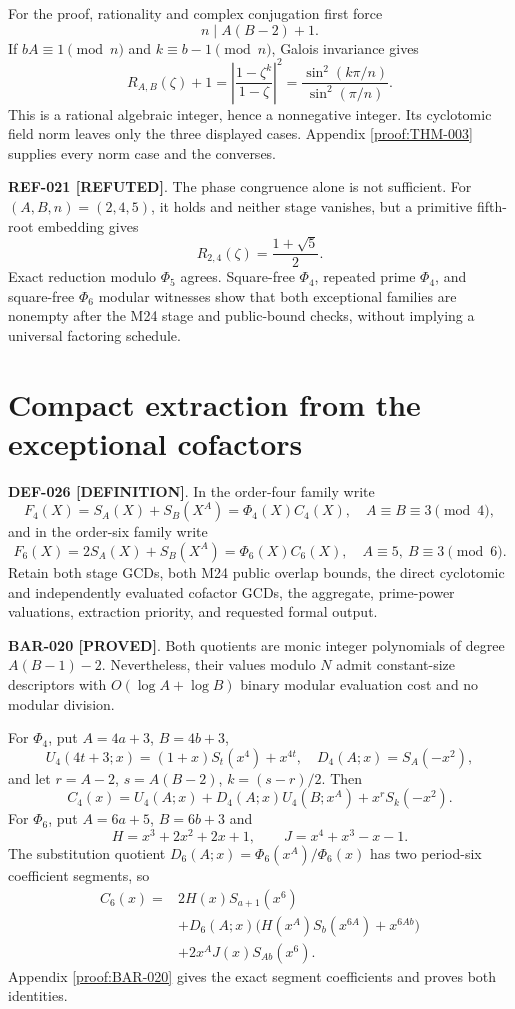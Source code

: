 \documentclass[11pt]{article}
\newcommand{\claimstatus}[2]{\textbf{#1 [#2]}}
\begin{document}
For the proof, rationality and complex conjugation first force
\[
n\mid A(B-2)+1.
\]
If \(bA\equiv1\pmod n\) and \(k\equiv b-1\pmod n\), Galois invariance gives
\[
R_{A,B}(\zeta)+1
=\left|\frac{1-\zeta^k}{1-\zeta}\right|^2
=\frac{\sin^2(k\pi/n)}{\sin^2(\pi/n)}.
\]
This is a rational algebraic integer, hence a nonnegative integer. Its
cyclotomic field norm leaves only the three displayed cases. Appendix
\ref{proof:THM-003} supplies every norm case and the converses.

\claimstatus{REF-021}{REFUTED}. The phase congruence alone is not sufficient.
For \((A,B,n)=(2,4,5)\), it holds and neither stage vanishes, but a primitive
fifth-root embedding gives
\[
R_{2,4}(\zeta)=\frac{1+\sqrt5}{2}.
\]
Exact reduction modulo \(\Phi_5\) agrees. Square-free \(\Phi_4\), repeated
prime \(\Phi_4\), and square-free \(\Phi_6\) modular witnesses show that both
exceptional families are nonempty after the M24 stage and public-bound checks,
without implying a universal factoring schedule.

\section{Compact extraction from the exceptional cofactors}

\claimstatus{DEF-026}{DEFINITION}. In the order-four family write
\[
F_4(X)=S_A(X)+S_B(X^A)=\Phi_4(X)C_4(X),
\quad A\equiv B\equiv3\pmod4,
\]
and in the order-six family write
\[
F_6(X)=2S_A(X)+S_B(X^A)=\Phi_6(X)C_6(X),
\quad A\equiv5,\ B\equiv3\pmod6.
\]
Retain both stage GCDs, both M24 public overlap bounds, the direct
cyclotomic and independently evaluated cofactor GCDs, the aggregate,
prime-power valuations, extraction priority, and requested formal output.

\claimstatus{BAR-020}{PROVED}. Both quotients are monic integer polynomials
of degree \(A(B-1)-2\). Nevertheless, their values modulo \(N\) admit
constant-size descriptors with \(O(\log A+\log B)\) binary modular
evaluation cost and no modular division.

For \(\Phi_4\), put \(A=4a+3\), \(B=4b+3\),
\[
U_4(4t+3;x)=(1+x)S_t(x^4)+x^{4t},
\quad D_4(A;x)=S_A(-x^2),
\]
and let \(r=A-2\), \(s=A(B-2)\), \(k=(s-r)/2\). Then
\[
C_4(x)=U_4(A;x)+D_4(A;x)U_4(B;x^A)+x^rS_k(-x^2).
\]
For \(\Phi_6\), put \(A=6a+5\), \(B=6b+3\) and
\[
H=x^3+2x^2+2x+1,\qquad J=x^4+x^3-x-1.
\]
The substitution quotient
\(D_6(A;x)=\Phi_6(x^A)/\Phi_6(x)\) has two period-six coefficient
segments, so
\[
\begin{split}
C_6(x)={}&2H(x)S_{a+1}(x^6)\\
&+D_6(A;x)\bigl(H(x^A)S_b(x^{6A})+x^{6Ab}\bigr)\\
&+2x^AJ(x)S_{Ab}(x^6).
\end{split}
\]
Appendix \ref{proof:BAR-020} gives the exact segment coefficients and proves
both identities.
\end{document}

